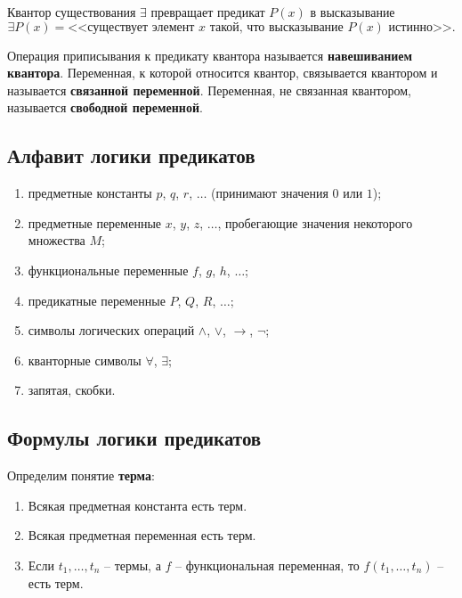 Квантор существования \(\exists\) превращает предикат \(P(x)\) в высказывание
\[
    \exists P(x) = \text{<<существует элемент \(x\) такой, что высказывание \(P(x)\) истинно>>}.
\]

Операция приписывания к предикату квантора называется \textbf{навешиванием квантора}. Переменная, к которой относится квантор, связывается квантором и называется \textbf{связанной переменной}. Переменная, не связанная квантором, называется \textbf{свободной переменной}.

\subsection{Алфавит логики предикатов}

\begin{enumerate}
    \item предметные константы \(p\), \(q\), \(r\), \(\ldots\) (принимают значения \(0\) или \(1\));
    \item предметные переменные \(x\), \(y\), \(z\), \(\ldots\), пробегающие значения некоторого множества \(M\);
    \item функциональные переменные \(f\), \(g\), \(h\), \(\ldots\);
    \item предикатные переменные \(P\), \(Q\), \(R\), \(\ldots\);
    \item символы логических операций \(\land\), \(\lor\), \(\to\), \(\neg\);
    \item кванторные символы \(\forall\), \(\exists\);
    \item запятая, скобки.
\end{enumerate}

\subsection{Формулы логики предикатов}

\noindent Определим понятие \textbf{терма}:
\begin{enumerate}
    \item Всякая предметная константа есть терм.
    \item Всякая предметная переменная есть терм.
    \item Если \(t_1, \ldots, t_n\) -- термы, а \(f\) -- функциональная переменная, то \(f(t_1, \ldots, t_n)\) -- есть терм.
\end{enumerate}

